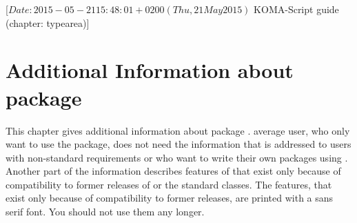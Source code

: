 %
%
%
%
%
%
%
%
% 
%
%
%
%

                 [$Date: 2015-05-21 15:48:01 +0200 (Thu, 21 May 2015) $
                  KOMA-Script guide (chapter: typearea)]


\chapter{Additional Information about package }

This chapter gives additional information about package
.  average user, who only want to use the package,
does not need the information that is addressed to users with non-standard
requirements or who want to write their own packages using
. Another part of the information describes features of
 that exist only because of compatibility to former releases
of \KOMAScript{} or the standard classes. The features, that exist only
because of compatibility to former \KOMAScript{} releases, are printed with a
sans serif font. You should not use them any longer.


